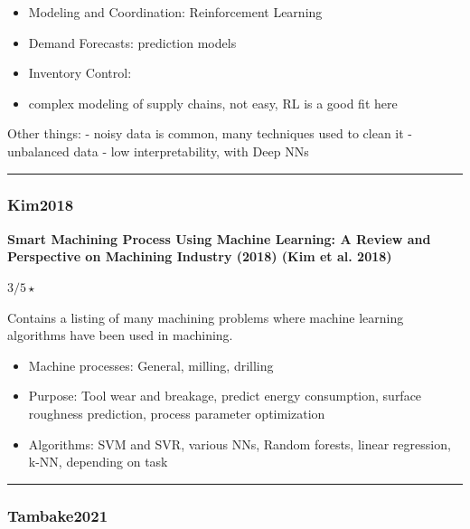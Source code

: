 \documentclass[
  letterpaper,
  DIV=11,
  numbers=noendperiod]{scrartcl}
\providecommand{\tightlist}{%
  \setlength{\itemsep}{0pt}\setlength{\parskip}{0pt}}\usepackage{longtable,booktabs,array}
\begin{document}
\begin{enumerate}
  \begin{itemize}
  \tightlist
  \item
    Modeling and Coordination: Reinforcement Learning
  \item
    Demand Forecasts: prediction models
  \item
    Inventory Control:\\
  \item
    complex modeling of supply chains, not easy, RL is a good fit here
  \end{itemize}
\end{enumerate}

Other things: - noisy data is common, many techniques used to clean it -
unbalanced data - low interpretability, with Deep NNs

\begin{center}\rule{0.5\linewidth}{0.5pt}\end{center}

\hypertarget{kim2018}{%
\subsubsection{Kim2018}\label{kim2018}}

\textbf{Smart Machining Process Using Machine Learning: A Review and
Perspective on Machining Industry (2018) (Kim et al. 2018)}

\(3/5 \star\)

Contains a listing of many machining problems where machine learning
algorithms have been used in machining.

\begin{itemize}
\tightlist
\item
  Machine processes: General, milling, drilling
\item
  Purpose: Tool wear and breakage, predict energy consumption, surface
  roughness prediction, process parameter optimization
\item
  Algorithms: SVM and SVR, various NNs, Random forests, linear
  regression, k-NN, depending on task
\end{itemize}

\begin{center}\rule{0.5\linewidth}{0.5pt}\end{center}

\hypertarget{tambake2021}{%
\subsubsection{Tambake2021}\label{tambake2021}}
\end{document}
